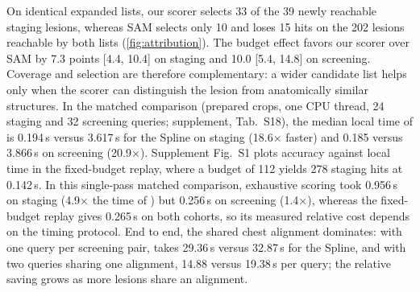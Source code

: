 On identical expanded lists, our scorer selects 33 of the 39 newly reachable staging lesions, whereas SAM selects only 10 and loses 15 hits on the 202 lesions reachable by both lists (\cref{fig:attribution}).
The budget effect favors our scorer over SAM by 7.3 points [4.4, 10.4] on staging and 10.0 [5.4, 14.8] on screening.
Coverage and selection are therefore complementary: a wider candidate list helps only when the scorer can distinguish the lesion from anatomically similar structures.
In the matched comparison (prepared crops, one CPU thread, 24 staging and 32 screening queries; supplement, Tab.~S18), the median local time of \ours is 0.194\,s versus 3.617\,s for the Spline on staging (18.6$\times$ faster) and 0.185 versus 3.866\,s on screening (20.9$\times$).
Supplement Fig.~S1 plots accuracy against local time in the fixed-budget replay, where a budget of 112 yields 278 staging hits at 0.142\,s.
In this single-pass matched comparison, exhaustive scoring took 0.956\,s on staging (4.9$\times$ the time of \ours) but 0.256\,s on screening (1.4$\times$), whereas the fixed-budget replay gives 0.265\,s on both cohorts, so its measured relative cost depends on the timing protocol.
End to end, the shared chest alignment dominates: with one query per screening pair, \ours takes 29.36\,s versus 32.87\,s for the Spline, and with two queries sharing one alignment, 14.88 versus 19.38\,s per query; the relative saving grows as more lesions share an alignment.
